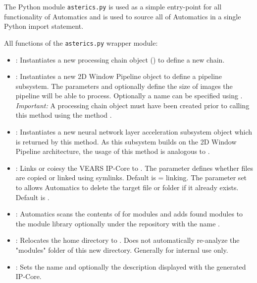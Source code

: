 The Python module \texttt{asterics.py} is used as a simple entry-point for all functionality of Automatics and is used to source all of Automatics in a single Python import statement.

All functions of the \texttt{asterics.py} wrapper module:
\begin{itemize}
\item {}: Instantiates a new processing chain object () to define a new \asterics chain.
\item {}: Instantiates a new 2D Window Pipeline object to define a pipeline subsystem. The parameters  and optionally  define the size of images the pipeline will be able to process. Optionally a name can be specified using . \emph{Important:} A processing chain object must have been created prior to calling this method using the method .
\item {}: Instantiates a new \asterics neural network layer acceleration subsystem object which is returned by this method. As this subsystem builds on the 2D Window Pipeline architecture, the usage of this method is analogous to .
\item {}: Links or coiesy the VEARS IP-Core to . The parameter  defines whether files are copied or linked using symlinks. Default is  = linking. The  parameter set to  allows Automatics to delete the target file or folder if it already exists. Default is .
\item {}: Automatics scans the contents of  for \asterics modules and adds found modules to the module library optionally under the repository with the name .
\item {}: Relocates the \asterics home directory to . Does not automatically re-analyze the "modules" folder of this new directory. Generally for internal use only.
\item {}: Sets the name and optionally the description displayed with the generated \asterics IP-Core.

\end{itemize}
